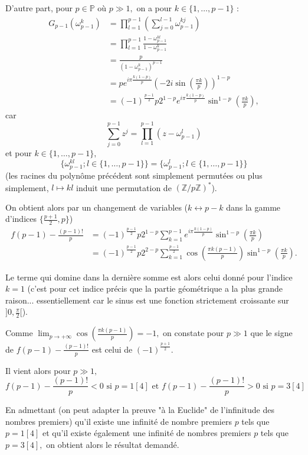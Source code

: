 \begin{enumerate}
D'autre part, pour $p\in \mathbb{P}$ où $p\gg1,$ on a pour $k\in \{1,\ldots,p-1\}$ : 
\begin{align*}
G_{p-1}(\omega_{p-1}^{k}) & = \prod_{l=1}^{p-1}\left(\sum_{j=0}^{l-1}\omega_{p-1}^{kj}\right)\\
& = \prod_{l=1}^{p-1}\frac{1-\omega_{p-1}^{kl}}{1-\omega_{p-1}^{k}}\\
& = \frac{p}{(1-\omega_{p-1}^{k})^{p-1}}\\
& = pe^{i\pi\frac{k(1-p)}{p}}\left( -2i\sin(\frac{\pi k}{p})\right)^{1-p}\\
& = (-1)^{\frac{p-1}{2}}p2^{1-p}e^{i\pi\frac{k(1-p)}{p}}\sin^{1-p}\left(\frac{\pi k}{p}\right),
\end{align*}
car $$\sum_{j=0}^{p-1}z^{j}=\prod_{l=1}^{p-1}(z-\omega_{p-1}^{l})$$ et pour $k\in\{1,\ldots,p-1\},$ $$\{\omega_{p-1}^{kl};l\in\{1,\ldots,p-1\}\}=\{\omega_{p-1}^{l};l\in\{1,\ldots,p-1\}\}$$ (les racines du polynôme précédent sont simplement permutées ou plus simplement, $l \mapsto kl$ induit une permutation de $\left(\mathbb{Z}/p\mathbb{Z}\right)^{*}$).

On obtient alors par un changement de variables ($\displaystyle k\leftrightarrow p-k$ dans la gamme d'indices $\displaystyle \{\frac{p+1}{2},p\}$)
\begin{align*}
f(p-1)-\frac{(p-1)!}{p} &  = (-1)^{\frac{p-1}{2}}p2^{1-p}\sum_{k=1}^{p-1}e^{i\pi\frac{k(1-p)}{p}}\sin^{1-p}\left(\frac{\pi k}{p}\right)\\
&  = (-1)^{\frac{p-1}{2}}p2^{2-p}\sum_{k=1}^{\frac{p-1}{2}}\cos\left( \frac{\pi k(p-1)}{p}\right)\sin^{1-p}\left(\frac{\pi k}{p}\right).
\end{align*}

Le terme qui domine dans la dernière somme est alors celui donné pour l'indice $k=1$ (c'est pour cet indice précis que la partie géométrique a la plus grande raison... essentiellement car le sinus est une fonction strictement croissante sur $\displaystyle ]0,\frac{\pi}{2}[$).

Comme $\displaystyle \lim_{p\rightarrow +\infty}\cos\left( \frac{\pi k(p-1)}{p}\right)=-1,$ on constate pour $p\gg1$ que le  signe de $\displaystyle f(p-1)-\frac{(p-1)!}{p}$ est celui de $\displaystyle (-1)^{\frac{p+1}{2}}.$

Il vient alors pour $p\gg 1,$ $$f(p-1)-\frac{(p-1)!}{p}<0 \mbox{ si } p=1[4] \mbox{ et } f(p-1)-\frac{(p-1)!}{p}>0 \mbox{ si } p=3[4]$$

En admettant (on peut adapter la preuve "à la Euclide" de l'infinitude des nombres premiers) qu'il existe une infinité de nombre premiers $p$ tels que $p=1[4]$ et qu'il existe également une infinité de nombres premiers $p$ tels que $p=3[4],$ on obtient alors 
le résultat demandé.
\end{enumerate}


